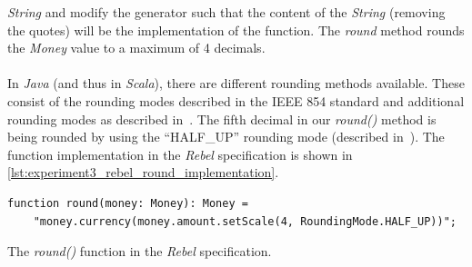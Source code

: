 \textit{String} and modify the generator such that the content of the
\textit{String} (removing the quotes) will be the implementation of the
function. The \textit{round} method rounds the \textit{Money} value to a maximum
of 4 decimals.\\
\\
In \textit{Java} (and thus in \textit{Scala}), there are different rounding
methods available. These consist of the rounding modes described in the IEEE 854
standard and additional rounding modes as described
in~\cite{cowlishaw2003decimal}. The fifth decimal in our \textit{round()} method
is being rounded by using the ``HALF\_UP'' rounding mode
(described in~\cite{cowlishaw2003decimal}). The function implementation in the
\textit{Rebel} specification is shown in
\autoref{lst:experiment3_rebel_round_implementation}.
\begin{sourcecode}[!ht]
\begin{lstlisting}[language=Rebel]
function round(money: Money): Money =
    "money.currency(money.amount.setScale(4, RoundingMode.HALF_UP))";
\end{lstlisting}
\caption{The \textit{round()} function in the \textit{Rebel} specification.}
\label{lst:experiment3_rebel_round_implementation}
\end{sourcecode}
\FloatBarrier\noindent

